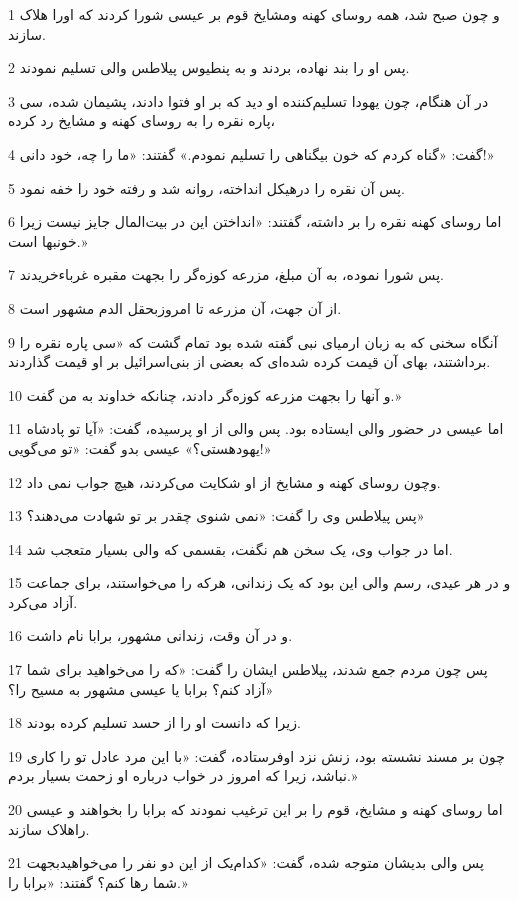\par 1 و چون صبح شد، همه روسای کهنه ومشایخ قوم بر عیسی شورا کردند که اورا هلاک سازند.
\par 2 پس او را بند نهاده، بردند و به پنطیوس پیلاطس والی تسلیم نمودند.
\par 3 در آن هنگام، چون یهودا تسلیم‌کننده او دید که بر او فتوا دادند، پشیمان شده، سی پاره نقره را به روسای کهنه و مشایخ رد کرده،
\par 4 گفت: «گناه کردم که خون بیگناهی را تسلیم نمودم.» گفتند: «ما را چه، خود دانی!»
\par 5 پس آن نقره را درهیکل انداخته، روانه شد و رفته خود را خفه نمود.
\par 6 اما روسای کهنه نقره را بر داشته، گفتند: «انداختن این در بیت‌المال جایز نیست زیرا خونبها است.»
\par 7 پس شورا نموده، به آن مبلغ، مزرعه کوزه‌گر را بجهت مقبره غرباءخریدند.
\par 8 از آن جهت، آن مزرعه تا امروزبحقل الدم مشهور است.
\par 9 آنگاه سخنی که به زبان ارمیای نبی گفته شده بود تمام گشت که «سی پاره نقره را برداشتند، بهای آن قیمت کرده شده‌ای که بعضی از بنی‌اسرائیل بر او قیمت گذاردند.
\par 10 و آنها را بجهت مزرعه کوزه‌گر دادند، چنانکه خداوند به من گفت.»
\par 11 اما عیسی در حضور والی ایستاده بود. پس والی از او پرسیده، گفت: «آیا تو پادشاه یهودهستی؟» عیسی بدو گفت: «تو می‌گویی!»
\par 12 وچون روسای کهنه و مشایخ از او شکایت می‌کردند، هیچ جواب نمی داد.
\par 13 پس پیلاطس وی را گفت: «نمی شنوی چقدر بر تو شهادت می‌دهند؟»
\par 14 اما در جواب وی، یک سخن هم نگفت، بقسمی که والی بسیار متعجب شد.
\par 15 و در هر عیدی، رسم والی این بود که یک زندانی، هر‌که را می‌خواستند، برای جماعت آزاد می‌کرد.
\par 16 و در آن وقت، زندانی مشهور، برابا نام داشت.
\par 17 پس چون مردم جمع شدند، پیلاطس ایشان را گفت: «که را می‌خواهید برای شما آزاد کنم؟ برابا یا عیسی مشهور به مسیح را؟»
\par 18 زیرا که دانست او را از حسد تسلیم کرده بودند.
\par 19 چون بر مسند نشسته بود، زنش نزد اوفرستاده، گفت: «با این مرد عادل تو را کاری نباشد، زیرا که امروز در خواب درباره او زحمت بسیار بردم.»
\par 20 اما روسای کهنه و مشایخ، قوم را بر این ترغیب نمودند که برابا را بخواهند و عیسی راهلاک سازند.
\par 21 پس والی بدیشان متوجه شده، گفت: «کدام‌یک از این دو نفر را می‌خواهیدبجهت شما رها کنم؟ گفتند: «برابا را.»
